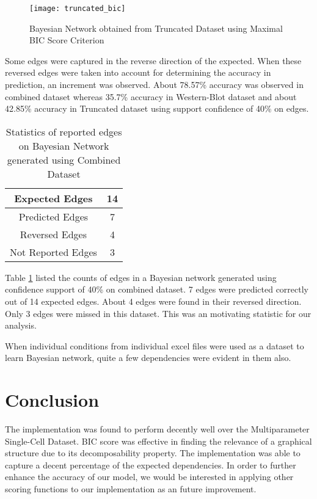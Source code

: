 \documentclass[conference]{IEEEtran}
\begin{document}
\begin{figure}[h]
\centering
\texttt{[image: truncated\_bic]}
\label{fig6}
\caption{Bayesian Network obtained from Truncated Dataset using Maximal BIC Score Criterion}
\end{figure}
\par
Some edges were captured in the reverse direction of the expected. When these reversed edges were taken into account for determining the accuracy in prediction, an increment was observed. About 78.57\% accuracy was observed in combined dataset whereas 35.7\% accuracy in Western-Blot dataset and about 42.85\% accuracy in Truncated dataset using support confidence of 40\% on edges.

\renewcommand{\arraystretch}{1.5}
\begin{table}[h!]
\centering
\begin{tabular}{||c | c||} 
 \hline
 Expected Edges & 14 \\ 
 \hline
 Predicted Edges & 7 \\
 \hline
 Reversed Edges & 4 \\
 \hline
 Not Reported Edges & 3 \\
 \hline
\end{tabular}
\bigskip
\caption{Statistics of reported edges on Bayesian Network generated using Combined Dataset}
\label{table1}
\end{table}

\par
Table \ref{table1} listed the counts of edges in a Bayesian network generated using confidence support of 40\% on combined dataset. 7 edges were predicted correctly out of 14 expected edges. About 4 edges were found in their reversed direction. Only 3 edges were missed in this dataset. This was an motivating statistic for our analysis.
\par
When individual conditions from individual excel files were used as a dataset to learn Bayesian network, quite a few dependencies were evident in them also.


\section{Conclusion}
The implementation was found to perform decently well over the Multiparameter Single-Cell Dataset. BIC score was effective in finding the relevance of a graphical structure due to its decomposability property. The implementation was able to capture a decent percentage of the expected dependencies. In order to further enhance the accuracy of our model, we would be interested in applying other scoring functions to our implementation as an future improvement.



\ifCLASSOPTIONcaptionsoff
  \newpage
\fi

\nocite{*}


\end{document}
